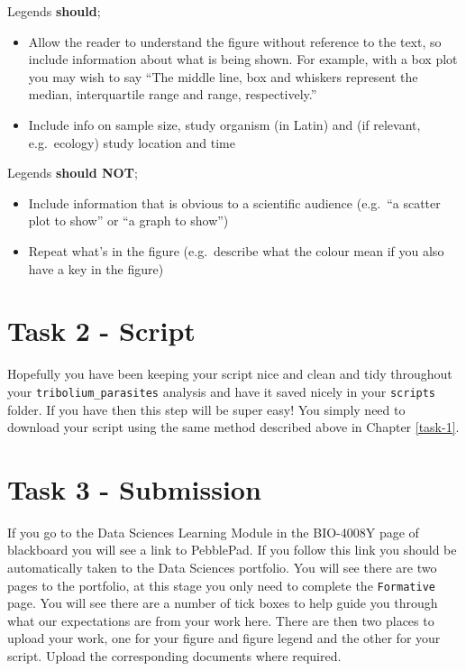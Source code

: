 \documentclass[
]{book}
\providecommand{\tightlist}{%
  \setlength{\itemsep}{0pt}\setlength{\parskip}{0pt}}
\begin{document}
Legends \textbf{should};

\begin{itemize}
\tightlist
\item
  Allow the reader to understand the figure without reference to the text, so include information about what is being shown. For example, with a box plot you may wish to say ``The middle line, box and whiskers represent the median, interquartile range and range, respectively.''
\item
  Include info on sample size, study organism (in Latin) and (if relevant, e.g.~ecology) study location and time
\end{itemize}

Legends \textbf{should NOT};

\begin{itemize}
\tightlist
\item
  Include information that is obvious to a scientific audience (e.g.~``a scatter plot to show'' or ``a graph to show'')
\item
  Repeat what's in the figure (e.g.~describe what the colour mean if you also have a key in the figure)
\end{itemize}

\hypertarget{task-2---script}{%
\section{Task 2 - Script}\label{task-2---script}}

Hopefully you have been keeping your script nice and clean and tidy throughout your \texttt{tribolium\_parasites} analysis and have it saved nicely in your \texttt{scripts} folder. If you have then this step will be super easy! You simply need to download your script using the same method described above in Chapter \ref{task-1}.

\hypertarget{task-3---submission}{%
\section{Task 3 - Submission}\label{task-3---submission}}

If you go to the Data Sciences Learning Module in the BIO-4008Y page of blackboard you will see a link to PebblePad. If you follow this link you should be automatically taken to the Data Sciences portfolio. You will see there are two pages to the portfolio, at this stage you only need to complete the \texttt{Formative} page. You will see there are a number of tick boxes to help guide you through what our expectations are from your work here. There are then two places to upload your work, one for your figure and figure legend and the other for your script. Upload the corresponding documents where required.
\end{document}
